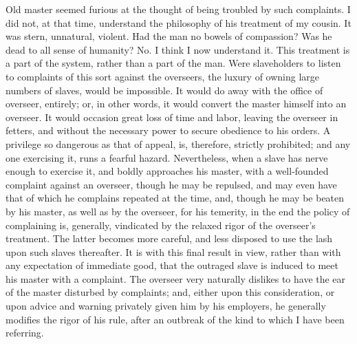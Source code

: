 Old master seemed furious at the thought of being troubled by such
complaints. I did not, at that time, understand the philosophy of his
treatment of my cousin. It was stern, unnatural, violent. Had the man no
bowels of compassion? Was he dead to all sense of humanity? No. I think
I now understand it. This treatment is a part of the system, rather than
a part of the man. Were slaveholders to listen to complaints of this
sort against the overseers, the luxury of owning large numbers of
slaves, would be impossible. It would do away with the office of
overseer, entirely; or, in other words, it would convert the master
himself into an overseer. It would occasion great loss of time and
labor, leaving the overseer in fetters, and without the necessary power
to secure obedience to his orders. A privilege so dangerous as that of
appeal, is, therefore, strictly prohibited; and any one exercising it,
runs a fearful hazard. Nevertheless, when a slave has nerve enough to
exercise it, and boldly approaches his master, with a well-founded
{\protect\hypertarget{84}{}{}}complaint against an overseer, though he
may be repulsed, and may even have that of which he complains repeated
at the time, and, though he may be beaten by his master, as well as by
the overseer, for his temerity, in the end the policy of complaining is,
generally, vindicated by the relaxed rigor of the overseer's treatment.
The latter becomes more careful, and less disposed to use the lash upon
such slaves thereafter. It is with this final result in view, rather
than with any expectation of immediate good, that the outraged slave is
induced to meet his master with a complaint. The overseer very naturally
dislikes to have the ear of the master disturbed by complaints; and,
either upon this consideration, or upon advice and warning privately
given him by his employers, he generally modifies the rigor of his rule,
after an outbreak of the kind to which I have been referring.


